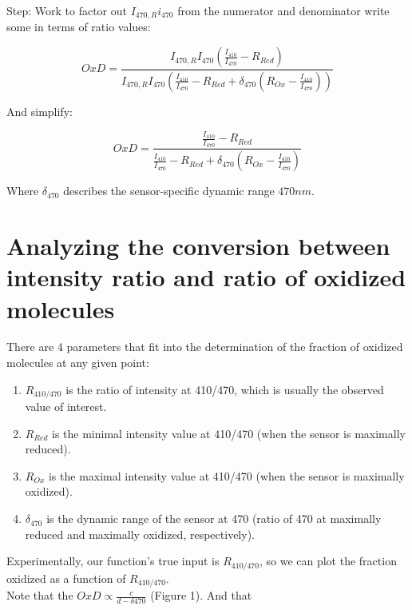 \documentclass{article}
\begin{document}
Step: Work to factor out $I_{470, R}i_{470}$ from the numerator and denominator write some in terms of ratio values:

$$ OxD = \frac{I_{470, R}I_{470}(\frac{I_{410}}{I_{470}} - R_{Red})}{I_{470, R}I_{470}(\frac{I_{410}}{I_{470}}-R_{Red} + \delta_{470}(R_{Ox}-\frac{I_{410}}{I_{470}}))}  $$

And simplify:

\begin{equation}
OxD = \frac{\frac{I_{410}}{I_{470}} - R_{Red}}{\frac{I_{410}}{I_{470}}-R_{Red} + \delta_{470}(R_{Ox}-\frac{I_{410}}{I_{470}})} 
\end{equation}

Where $\delta_{470}$ describes the sensor-specific dynamic range $470nm$.

\section{Analyzing the conversion between intensity ratio and ratio of oxidized molecules}

There are 4 parameters that fit into the determination of the fraction of oxidized molecules at any given point:

\begin{enumerate}
    \item $R_{410/470}$ is the ratio of intensity at 410/470, which is usually the observed value of interest.
    \item $R_{Red}$ is the minimal intensity value at 410/470 (when the sensor is maximally reduced).
    \item $R_{Ox}$ is the maximal intensity value at 410/470 (when the sensor is maximally oxidized).
    \item $\delta_{470}$ is the dynamic range of the sensor at 470 (ratio of 470 at maximally reduced and maximally oxidized, respectively).
\end{enumerate}

Experimentally, our function's true input is $R_{410/470}$, so we can plot the fraction oxidized as a function of $R_{410/470}$.  \\

Note that the $OxD \propto \frac{c}{d-\delta{470}}$ (Figure 1). And that 
\end{document}
